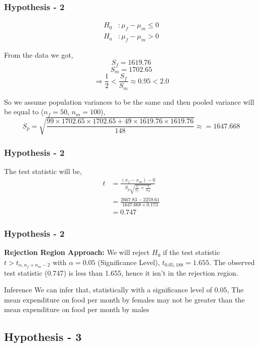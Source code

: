 \documentclass{beamer}
\begin{document}
\begin{frame}
    \frametitle{Hypothesis - 2}
    \begin{align}
        H_0 &: \mu_f - \mu_m \leq 0 \\
        H_a &: \mu_f - \mu_m > 0
    \end{align}
    
    From the data we got,
    \[ S_f = 1619.76 \]
    \[ S_m = 1702.65 \]
    \[ \Rightarrow \frac{1}{2} < \frac{S_f}{S_m} \approx 0.95 < 2.0 \]
    
    So we assume population variances to be the same and then pooled variance will be equal to ($n_f = 50$, $n_m = 100$),
    \begin{equation}
        S_p = \sqrt{\frac{99 \times 1702.65 \times 1702.65 + 49 \times 1619.76 \times 1619.76}{148}} \approx  = 1647.668
    \end{equation}
\end{frame}
\begin{frame}
    \frametitle{Hypothesis - 2}
    The test statistic will be,
    \begin{align}
        t &= \frac{(x_f - x_m) - 0}{S_p \sqrt{\frac{1}{n_f} + \frac{1}{n_m}}} \\
        &= \frac{2667.83 -2259.61}{ 1647.668\times 0.173} \\
        & = 0.747
    \end{align}
\end{frame}
\begin{frame}
    \frametitle{Hypothesis - 2}
    \textbf{Rejection Region Approach:}
We will reject \( H_0 \) if the test statistic \( t > t_{\alpha,n_f+n_m-2} \) with \( \alpha = 0.05 \) (Significance Level),
\( t_{0.05,188} = 1.655 \).
The observed test statistic (0.747) is less than 1.655, hence it isn't in the rejection region.

\begin{block}{Inference} We can infer that, statistically with a significance level of $0.05$, The mean expenditure on food per month by females may not be greater than the mean expenditure on food per month by males
 \end{block}
 
\end{frame}
\subsection{Hypothesis - 3}
\end{document}
